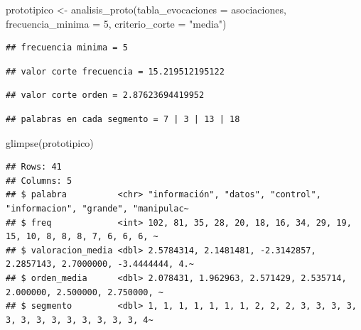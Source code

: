 \documentclass[
]{book}
\newenvironment{Shaded}{\begin{snugshade}}{\end{snugshade}}
\newcommand{\AttributeTok}[1]{\textcolor[rgb]{0.77,0.63,0.00}{#1}}
\newcommand{\DecValTok}[1]{\textcolor[rgb]{0.00,0.00,0.81}{#1}}
\newcommand{\FunctionTok}[1]{\textcolor[rgb]{0.00,0.00,0.00}{#1}}
\newcommand{\NormalTok}[1]{#1}
\newcommand{\OtherTok}[1]{\textcolor[rgb]{0.56,0.35,0.01}{#1}}
\newcommand{\StringTok}[1]{\textcolor[rgb]{0.31,0.60,0.02}{#1}}
\begin{document}
\begin{Shaded}
\begin{Highlighting}[]
\NormalTok{prototipico }\OtherTok{\textless{}{-}} \FunctionTok{analisis\_proto}\NormalTok{(}\AttributeTok{tabla\_evocaciones =}\NormalTok{ asociaciones, }\AttributeTok{frecuencia\_minima =} \DecValTok{5}\NormalTok{, }\AttributeTok{criterio\_corte =} \StringTok{"media"}\NormalTok{)}
\end{Highlighting}
\end{Shaded}

\begin{verbatim}
## frecuencia minima = 5
\end{verbatim}

\begin{verbatim}
## valor corte frecuencia = 15.219512195122
\end{verbatim}

\begin{verbatim}
## valor corte orden = 2.87623694419952
\end{verbatim}

\begin{verbatim}
## palabras en cada segmento = 7 | 3 | 13 | 18
\end{verbatim}

\begin{Shaded}
\begin{Highlighting}[]
\FunctionTok{glimpse}\NormalTok{(prototipico)}
\end{Highlighting}
\end{Shaded}

\begin{verbatim}
## Rows: 41
## Columns: 5
## $ palabra          <chr> "información", "datos", "control", "informacion", "grande", "manipulac~
## $ freq             <int> 102, 81, 35, 28, 20, 18, 16, 34, 29, 19, 15, 10, 8, 8, 8, 7, 6, 6, 6, ~
## $ valoracion_media <dbl> 2.5784314, 2.1481481, -2.3142857, 2.2857143, 2.7000000, -3.4444444, 4.~
## $ orden_media      <dbl> 2.078431, 1.962963, 2.571429, 2.535714, 2.000000, 2.500000, 2.750000, ~
## $ segmento         <dbl> 1, 1, 1, 1, 1, 1, 1, 2, 2, 2, 3, 3, 3, 3, 3, 3, 3, 3, 3, 3, 3, 3, 3, 4~
\end{verbatim}
\end{document}
